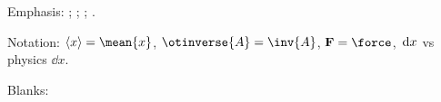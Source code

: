 \documentclass{article}
\begin{document}
Emphasis:  ;  ;
 ;  .

Notation: $\otmean{x} = \mean{x}$, $\otinverse{A} = \inv{A}$,
$\otforce = \force$, $\,\mathrm{d} x$ vs physics $\dd{x}$.

 
Blanks: \otblank \blank[2cm] \otbigblank \otlongblank \otcomponentblank
\end{document}
